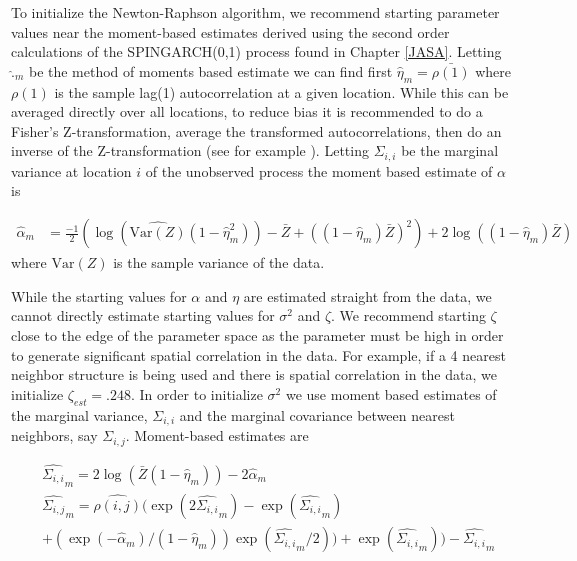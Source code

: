 \documentclass[11pt]{isuthesis}
\begin{document}
	To initialize the Newton-Raphson algorithm, we recommend starting parameter values near the moment-based estimates derived using the second order calculations of the SPINGARCH(0,1) process found in Chapter \ref{JASA}.  Letting $\widehat{.}_m$ be the method of moments based estimate we can find first $\widehat{\eta}_m=\bar{\rho(1)}$ where $\rho(1)$ is the sample lag(1) autocorrelation at a given location.  While this can be averaged directly over all locations, to reduce bias it is recommended to do a Fisher's Z-transformation, average the transformed autocorrelations, then do an inverse of the Z-transformation (see for example \cite{silver1987averaging}).  Letting $\Sigma_{i,i}$ be the marginal variance at location $i$ of the unobserved process the moment based estimate of $\alpha$ is

	\begin{align}
		\widehat{\alpha}_m & = \frac{-1}{2}\left(\log\left(\widehat{\mbox{Var}(Z)}(1-\widehat{\eta}_m^2)\right)-\bar{Z}+((1-\widehat{\eta}_m)\bar{Z})^2\right)+2\log\left((1-\widehat{\eta}_m)\bar{Z}\right)
		 \label{eq:alphamom}
	\end{align}
	 where $\widehat{\mbox{Var}(Z)}$ is the sample variance of the data.
	 
	 While the starting values for $\alpha$ and $\eta$ are estimated straight from the data, we cannot directly estimate starting values for $\sigma^2$ and $\zeta$.  We recommend starting $\zeta$ close to the edge of the parameter space as the parameter must be high in order to generate significant spatial correlation in the data.  For example, if a 4 nearest neighbor structure is being used and there is spatial correlation in the data, we initialize $\zeta_{est}=.248$.  In order to initialize $\sigma^2$ we use moment based estimates of the marginal variance, $\Sigma_{i,i}$ and the marginal covariance between nearest neighbors, say $\Sigma_{i,j}$.  Moment-based estimates are

	\begin{align}
		& \widehat{\Sigma_{i,i}}_m = 2\log(\bar{Z}(1-\widehat{\eta}_m))-2\widehat{\alpha}_m\\
		& \widehat{\Sigma_{i,j}}_m = \widehat{\rho(i,j)}(\exp(2\widehat{\Sigma_{i,i}}_m)-\exp(\widehat{\Sigma_{i,i}}_m)\nonumber \\
		&+(\exp(-\widehat{\alpha}_m)/(1-\widehat{\eta}_m))\exp(\widehat{\Sigma_{i,i}}_m/2))+\exp(\widehat{\Sigma_{i,i}}_m))-\widehat{\Sigma_{i,i}}_m \label{eq:sigmamom}
	\end{align}
\end{document}
